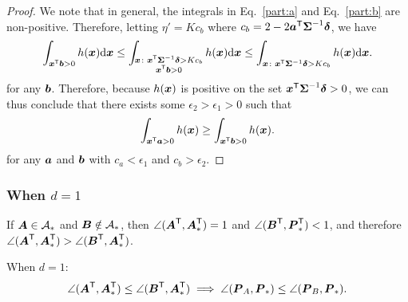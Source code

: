 \documentclass[10pt]{article}
\begin{document}
\begin{proof}
We note that in general, the integrals in Eq.~\eqref{part:a} and Eq.~\eqref{part:b} are non-positive. Therefore, letting $\eta' = K c_b$ where $c_b = 2 - 2 \boldsymbol{a}^{\mathsf{T}} \boldsymbol{\Sigma}^{-1} \boldsymbol{\delta}$, we have
\begin{equation*}
\int_{\boldsymbol{x}^{\mathsf{T}} \boldsymbol{b} > 0} h(\boldsymbol{x}) \mathrm{d} \boldsymbol{x} \leq \int_{\substack{\boldsymbol{x} \colon \boldsymbol{x}^{\mathsf{T}} \boldsymbol{\Sigma}^{-1} \boldsymbol{\delta} > K c_b \\ \boldsymbol{x}^{\mathsf{T}} \boldsymbol{b} > 0 }} h(\boldsymbol{x}) \mathrm{d} \boldsymbol{x} \leq
\int_{\boldsymbol{x} \colon \boldsymbol{x}^{\mathsf{T}} \boldsymbol{\Sigma}^{-1} \boldsymbol{\delta} > K c_b } h(\boldsymbol{x}) \mathrm{d} \boldsymbol{x}.
\end{equation*}
for any $\boldsymbol{b}$. 
Therefore, because $h(\boldsymbol{x})$ is positive on the set $\boldsymbol{x}^{\mathsf{T}} \boldsymbol{\Sigma}^{-1} \boldsymbol{\delta} > 0$, we can thus conclude that there exists some $\epsilon_2 > \epsilon_1 > 0$ such that
\begin{equation*}
\int_{\boldsymbol{x}^{\mathsf{T}} \boldsymbol{a} > 0} h(\boldsymbol{x}) \geq \int_{\boldsymbol{x}^{\mathsf{T}} \boldsymbol{b} > 0} h(\boldsymbol{x}).
\end{equation*}
for any $\boldsymbol{a}$ and $\boldsymbol{b}$ with $c_a < \epsilon_1$ and $c_b > \epsilon_2$. 

\end{proof}







\subsubsection{When $d=1$}

\begin{remark}
If $\boldsymbol{A} \in \mathcal{A}_*$ and $\boldsymbol{B} \notin \mathcal{A}_*$, then $\angle(\boldsymbol{A}^{\mathsf{T}},\boldsymbol{A}_*^{\mathsf{T}})=1$ and $\angle(\boldsymbol{B}^{\mathsf{T}},\boldsymbol{P}_*^{\mathsf{T}})<1$, and therefore $\angle(\boldsymbol{A}^{\mathsf{T}},\boldsymbol{A}_*^{\mathsf{T}}) > \angle(\boldsymbol{B}^{\mathsf{T}},\boldsymbol{A}_*^{\mathsf{T}})$.
\end{remark}



\begin{lem} \label{q:angle}
When $d=1$:
\label{q:a1}
$$\angle(\boldsymbol{A}^{\mathsf{T}},\boldsymbol{A}_*^{\mathsf{T}}) \leq \angle(\boldsymbol{B}^{\mathsf{T}},\boldsymbol{A}_*^{\mathsf{T}}) \implies \angle(\boldsymbol{P}_A,\boldsymbol{P}_*) \leq \angle(\boldsymbol{P}_B,\boldsymbol{P}_*).$$
\end{lem}
\end{document}
